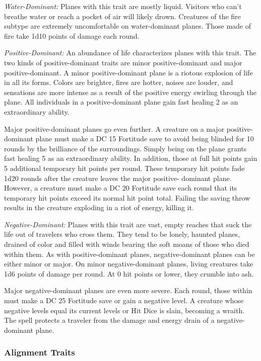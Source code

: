 \textit{Water-Dominant:} Planes with this trait are mostly liquid. Visitors who 
can't breathe water or reach a pocket of air will likely drown. Creatures of the 
fire subtype are extremely uncomfortable on water-dominant planes. Those made of 
fire take 1d10 points of damage each round.

\textit{Positive-Dominant:} An abundance of life characterizes planes with this 
trait. The two kinds of positive-dominant traits are minor positive-dominant and 
major positive-dominant. A minor positive-dominant plane is a riotous explosion 
of life in all its forms. Colors are brighter, fires are hotter, noises are louder, 
and sensations are more intense as a result of the positive energy swirling through 
the plane. All individuals in a positive-dominant plane gain fast healing 2 as 
an extraordinary ability.

Major positive-dominant planes go even further. A creature on a major positive-dominant 
plane must make a DC 15 Fortitude save to avoid being blinded for 10 rounds by 
the brilliance of the surroundings. Simply being on the plane grants fast healing 
5 as an extraordinary ability. In addition, those at full hit points gain 5 additional 
temporary hit points per round. These temporary hit points fade 1d20 rounds after 
the creature leaves the major positive- dominant plane. However, a creature must 
make a DC 20 Fortitude save each round that its temporary hit points exceed its 
normal hit point total. Failing the saving throw results in the creature exploding 
in a riot of energy, killing it.

\textit{Negative-Dominant:} Planes with this trait are vast, empty reaches that 
suck the life out of travelers who cross them. They tend to be lonely, haunted 
planes, drained of color and filled with winds bearing the soft moans of those 
who died within them. As with positive-dominant planes, negative-dominant planes 
can be either minor or major. On minor negative-dominant planes, living creatures 
take 1d6 points of damage per round. At 0 hit points or lower, they crumble into 
ash.

Major negative-dominant planes are even more severe. Each round, those within must 
make a DC 25 Fortitude save or gain a negative level. A creature whose negative 
levels equal its current levels or Hit Dice is slain, becoming a wraith. The 
spell protects a traveler from the damage and energy drain of a negative-dominant 
plane.

\subsubsection{Alignment Traits}

